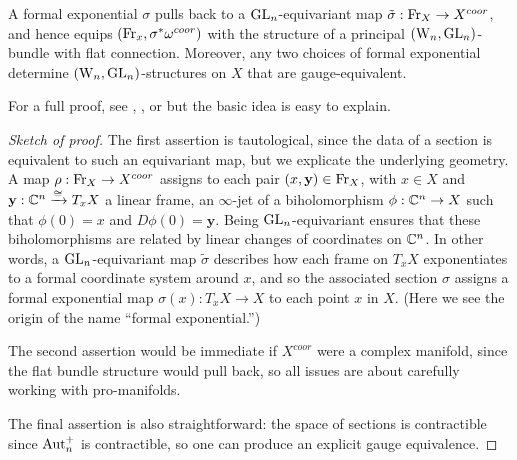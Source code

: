 % 

\begin{prop} \label{gauge equiv} 
A formal exponential $\sigma$ pulls back to a ${\rm GL}_n$-equivariant map $\tilde{\sigma} : {\rm Fr}_X \to X^{coor}$,
and hence equips $({\rm Fr}_x, \sigma^* \omega^{coor})$ with the structure
of a principal $({{\rm W}_n},{\rm GL}_n)$-bundle with flat connection.
Moreover, any two choices of formal exponential determine $({{\rm W}_n},{\rm GL}_n)$-structures on $X$ that are gauge-equivalent. 
\end{prop}

For a full proof, see \cite{NT}, \cite{nest1995}, or \cite{khors} but the basic idea is easy to explain.

\begin{proof}[Sketch of proof]
The first assertion is tautological, since the data of a section is equivalent to such an equivariant map, but we explicate the underlying geometry.
A map $\rho : {\rm Fr}_X \to X^{coor}$ assigns to each pair  $(x, \mathbf{y}) \in {\rm Fr}_X$,
with $x \in X$ and $\mathbf{y} : \mathbb C^n \xrightarrow{\cong} T_x X$ a linear frame,
an $\infty$-jet of a biholomorphism $\phi: \mathbb C^n \to X$ such that $\phi(0) = x$ and $D\phi(0) = \mathbf{y}$.
Being ${\rm GL}_n$-equivariant ensures that these biholomorphisms are related by linear changes of coordinates on $\mathbb C^n$.
In other words, a ${\rm GL}_n$-equivariant map $\tilde{\sigma}$ describes how each frame on $T_x X$ exponentiates to a formal coordinate system around $x$,
and so the associated section $\sigma$ assigns a formal exponential map $\sigma(x) \colon T_x X \to X$ to each point $x$ in $X$.
(Here we see the origin of the name ``formal exponential.'')

The second assertion would be immediate if $X^{coor}$ were a complex manifold, since the flat bundle structure would pull back,
so all issues are about carefully working with pro-manifolds.

The final assertion is also straightforward: the space of sections is contractible since ${\rm Aut}_n^+$ is contractible, 
so one can produce an explicit gauge equivalence.
\end{proof}

